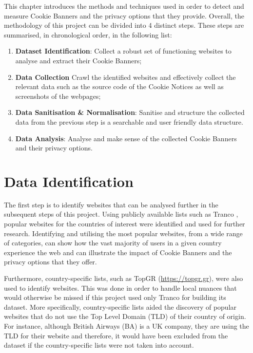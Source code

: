 \documentclass[../main.tex]{subfiles}
\begin{document}
This chapter introduces the methods and techniques used in order to detect and measure Cookie Banners and the privacy options that they provide. Overall, the methodology of this project can be divided into 4 distinct steps. These steps are summarised, in chronological order, in the following list:

\begin{enumerate}
    \item \textbf{Dataset Identification}: Collect a robust set of functioning websites to analyse and extract their Cookie Banners;
    
    \item \textbf{Data Collection} Crawl the identified websites and effectively collect the relevant data such as the source code of the Cookie Notices as well as screenshots of the webpages;
    
    \item \textbf{Data Sanitisation \& Normalisation}: Sanitise and structure the collected data from the previous step is a searchable and user friendly data structure.
    
    \item \textbf{Data Analysis}: Analyse and make sense of the collected Cookie Banners and their privacy options. 
\end{enumerate}

\section{Data Identification}
The first step is to identify websites that can be analysed further in the subsequent steps of this project. Using publicly available lists such as Tranco \cite{LePochat2019}, popular websites for the countries of interest were identified and used for further research. Identifying and utilising the most popular websites, from a wide range of categories, can show how the vast majority of users in a given country experience the web and can illustrate the impact of Cookie Banners and the privacy options that they offer.

Furthermore, country-specific lists, such as TopGR (\url{https://topgr.gr}), were also used to identify websites. This was done in order to handle local nuances that would otherwise be missed if this project used only Tranco for building its dataset. More specifically, country-specific lists aided the discovery of popular websites that do not use the Top Level Domain (TLD) of their country of origin. For instance, although British Airways (BA) is a UK company, they are using the  TLD for their website and therefore, it would have been excluded from the dataset if the country-specific lists were not taken into account.
\end{document}

